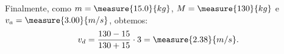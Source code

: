 \begin{question}
\begin{solution}
		Finalmente, como $m = \measure{15.0}{kg}$, $M = \measure{130}{kg}$ e $v_a = \measure{3.00}{m/s}$, obtemos:
		\begin{equation*}
			v_d = \frac{130 - 15}{130 + 15} \cdot 3 = \measure{2.38}{m/s}.
		\end{equation*}
	\end{solution}
\end{question}

\begin{comment}
	```python
	def question_9(v, m, M):
		v_joao = (M - m)/(M + m) * v
		v_jeronima = 2 * m /(M + m) * v
		return [v_joao, v_jeronima]
	```
\end{comment}